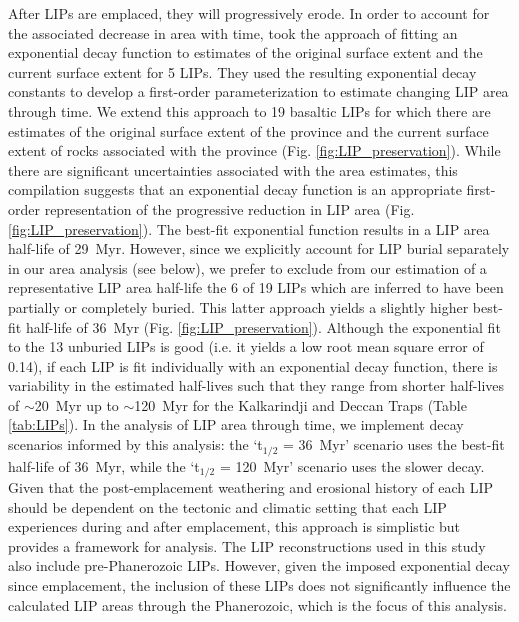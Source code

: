 \documentclass[11pt,letterpaper]{article}
\begin{document}
After LIPs are emplaced, they will progressively erode. In order to account for the associated decrease in area with time, \citet{Godderis2017a} took the approach of fitting an exponential decay function to estimates of the original surface extent and the current surface extent for 5 LIPs. They used the resulting exponential decay constants to develop a first-order parameterization to estimate changing LIP area through time. We extend this approach to 19 basaltic LIPs for which there are estimates of the original surface extent of the province and the current surface extent of rocks associated with the province (Fig. \ref{fig:LIP_preservation}). While there are significant uncertainties associated with the area estimates, this compilation suggests that an exponential decay function is an appropriate first-order representation of the progressive reduction in LIP area (Fig. \ref{fig:LIP_preservation}). The best-fit exponential function results in a LIP area half-life of 29~Myr. However, since we explicitly account for LIP burial separately in our area analysis (see below), we prefer to exclude from our estimation of a representative LIP area half-life the 6 of 19 LIPs which are inferred to have been partially or completely buried. This latter approach yields a slightly higher best-fit half-life of 36~Myr (Fig. \ref{fig:LIP_preservation}). Although the exponential fit to the 13 unburied LIPs is good (i.e. it yields a low root mean square error of 0.14), if each LIP is fit individually with an exponential decay function, there is variability in the estimated half-lives such that they range from shorter half-lives of $\sim$20~Myr up to $\sim$120~Myr for the Kalkarindji and Deccan Traps (Table \ref{tab:LIPs}). In the analysis of LIP area through time, we implement decay scenarios informed by this analysis: the `t$_{1/2}$ = 36~Myr' scenario uses the best-fit half-life of 36~Myr, while the `t$_{1/2}$ = 120~Myr' scenario uses the slower decay. Given that the post-emplacement weathering and erosional history of each LIP should be dependent on the tectonic and climatic setting that each LIP experiences during and after emplacement, this approach is simplistic but provides a framework for analysis. The LIP reconstructions used in this study also include pre-Phanerozoic LIPs. However, given the imposed exponential decay since emplacement, the inclusion of these LIPs does not significantly influence the calculated LIP areas through the Phanerozoic, which is the focus of this analysis.
\end{document}
